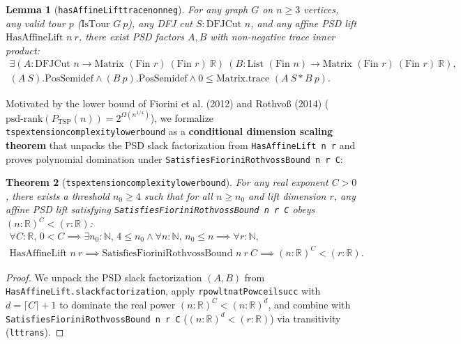 \documentclass[11pt,a4paper]{article}
\renewcommand{\_}{\origunderscore\allowbreak}
\theoremstyle{plain}
\newtheorem{theorem}{Theorem}[section]
\newtheorem{lemma}[theorem]{Lemma}
\theoremstyle{definition}
\theoremstyle{remark}
\begin{document}
\begin{lemma}[\texttt{hasAffineLift\_trace\_nonneg}]
For any graph $G$ on $n \ge 3$ vertices, any valid tour $p$ ($\text{IsTour } G\ p$), any DFJ cut $S : \text{DFJCut } n$, and any affine PSD lift $\text{HasAffineLift } n\ r$, there exist PSD factors $A, B$ with non-negative trace inner product:
\begin{equation*}
\begin{aligned}
  \exists (A : \text{DFJCut } n \to \text{Matrix } (\text{Fin } r)\ (\text{Fin } r)\ \mathbb{R})\ (B : \text{List } (\text{Fin } n) \to \text{Matrix } (\text{Fin } r)\ (\text{Fin } r)\ \mathbb{R}), \\
  (A\ S).\text{PosSemidef} \land (B\ p).\text{PosSemidef} \land 0 \le \text{Matrix.trace } (A\ S * B\ p).
\end{aligned}
\end{equation*}
\end{lemma}

Motivated by the lower bound of Fiorini et al. (2012) \cite{fiorini2012} and Rothvo\ss{} (2014) \cite{rothvoss2014} ($\text{psd-rank}(P_{\text{TSP}}(n)) = 2^{\Omega(n^{1/4})}$), we formalize \texttt{tsp\_extension\_complexity\_lower\_bound} as a \textbf{conditional dimension scaling theorem} that unpacks the PSD slack factorization from \texttt{HasAffineLift n r} and proves polynomial domination under \texttt{Satisfies\allowbreak Fiorini\allowbreak Rothvoss\allowbreak Bound n r C}:

\begin{theorem}[\texttt{tsp\_extension\_complexity\_lower\_bound}]
For any real exponent $C > 0$, there exists a threshold $n_0 \ge 4$ such that for all $n \ge n_0$ and lift dimension $r$, any affine PSD lift satisfying \texttt{Satisfies\allowbreak Fiorini\allowbreak Rothvoss\allowbreak Bound n r C} obeys $(n : \mathbb{R})^C < (r : \mathbb{R})$:
\begin{equation*}
\begin{aligned}
  \forall C : \mathbb{R},\, 0 < C \implies \exists n_0 : \mathbb{N},\, 4 \le n_0 \land \forall n : \mathbb{N},\, n_0 \le n \implies \forall r : \mathbb{N}, \\
  \text{HasAffineLift } n\ r \implies \text{SatisfiesFioriniRothvossBound } n\ r\ C \implies (n : \mathbb{R})^C < (r : \mathbb{R}).
\end{aligned}
\end{equation*}
\end{theorem}
\begin{proof}
We unpack the PSD slack factorization $(A, B)$ from \texttt{HasAffineLift.slack\_factorization}, apply \texttt{rpow\_lt\_natPow\_ceil\_succ} with $d = \lceil C \rceil + 1$ to dominate the real power $(n : \mathbb{R})^C < (n : \mathbb{R})^d$, and combine with \texttt{Satisfies\allowbreak Fiorini\allowbreak Rothvoss\allowbreak Bound n r C} ($(n : \mathbb{R})^d < (r : \mathbb{R})$) via transitivity (\texttt{lt\_trans}).
\end{proof}
\end{document}
